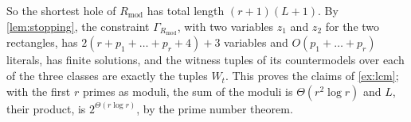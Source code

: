 So the shortest hole of $R_{\mathrm{mod}}$ has total length $(r+1)(L+1)$.
By \cref{lem:stopping}, the constraint $\Gamma_{R_{\mathrm{mod}}}$, with two
variables $z_1$ and $z_2$ for the two rectangles, has
$2(r+p_1+\dots+p_r+4)+3$ variables and $O(p_1+\dots+p_r)$ literals, has
finite solutions, and the witness tuples of its countermodels over each of
the three classes are exactly the tuples $W_t$. This proves the claims of
\cref{ex:lcm}; with the first $r$ primes as moduli, the sum of the moduli is
$\Theta(r^2\log r)$ and $L$, their product, is $2^{\Theta(r\log r)}$, by the
prime number theorem.
